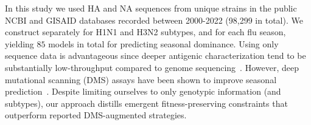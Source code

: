 \documentclass[onecolumn, compsoc,10pt]{IEEEtran}
\begin{document}
In this study we used  HA and NA  sequences from   unique \infl strains in the public NCBI and GISAID databases recorded between 2000-2022 (98,299 in total). We  construct  separately for H1N1 and H3N2 subtypes, and for each flu season, yielding $85$ models in total for predicting seasonal dominance. %
Using only sequence data is advantageous since deeper antigenic characterization  tend to be substantially  low-throughput compared to genome sequencing~\cite{wood2012reproducibility}. However,   deep mutational scanning (DMS) assays  have been shown to improve seasonal prediction~\cite{huddleston2020integrating}. Despite limiting ourselves to only genotypic  information (and subtypes), our approach  distills  emergent  fitness-preserving constraints   that outperform reported DMS-augmented strategies.
\end{document}
